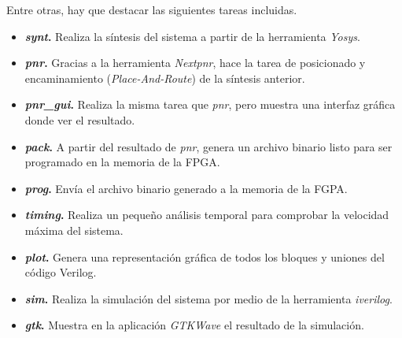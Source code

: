 Entre otras, hay que destacar las siguientes tareas incluidas.
\begin{itemize}
    \item \textbf{\emph{synt}.} Realiza la síntesis del sistema a partir de la herramienta \emph{Yosys}.
    \item \textbf{\emph{pnr}.} Gracias a la herramienta \emph{Nextpnr}, hace la tarea de posicionado y encaminamiento (\emph{Place-And-Route}) de la síntesis anterior.
    \item \textbf{\emph{pnr\_gui}.} Realiza la misma tarea que \emph{pnr}, pero muestra una interfaz gráfica donde ver el resultado.
    \item \textbf{\emph{pack}.} A partir del resultado de \emph{pnr}, genera un archivo binario listo para ser programado en la memoria de la FPGA.
    \item \textbf{\emph{prog}.} Envía el archivo binario generado a la memoria de la FGPA.
    \item \textbf{\emph{timing}.} Realiza un pequeño análisis temporal para comprobar la velocidad máxima del sistema.
    \item \textbf{\emph{plot}.} Genera una representación gráfica de todos los bloques y uniones del código Verilog.
    \item \textbf{\emph{sim}.} Realiza la simulación del sistema por medio de la herramienta \emph{iverilog}.
    \item \textbf{\emph{gtk}.} Muestra en la aplicación \emph{GTKWave} el resultado de la simulación.
\end{itemize}



